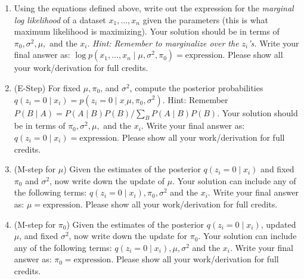 \begin{enumerate}
\item {} Using the equations defined above, write out the
  expression for the {\em marginal log likelihood} of a dataset $x_1,
  \dots, x_n$ given the parameters (this is what maximum likelihood is
  maximizing). Your solution should be in terms of $\pi_0, \sigma^2,
  \mu,$ and the $x_i$. {\em Hint: Remember to marginalize over the
    $z_i$'s.}  Write your final answer as: $\log p(x_1,\dots,x_n \mid
  \mu,\sigma^2,\pi_0) = \textrm{expression}$. Please show all your work/derivation for full credits.


\item {} (E-Step) For fixed $\mu,\pi_0$, and $\sigma^2$,
  compute the posterior probabilities $q(z_i = 0 \mid x_i) = p(z_i = 0
  \mid x_, \mu,\pi_0,\sigma^2)$.  Hint: Remember $P(B \mid A) = P(A
  \mid B)P(B)/\sum_B P(A \mid B)P(B)$.  Your solution should be in
  terms of $\pi_0, \sigma^2, \mu,$ and the $x_i$.  Write your final
  answer as: $q(z_i = 0 \mid x_i) = \textrm{expression}$. Please show all your work/derivation for full credits.
  
  
\item {} (M-step for $\mu$) Given the estimates of the
  posterior $q(z_i = 0 \mid x_i)$ and fixed $\pi_0$ and $\sigma^2$,
  now write down the update of $\mu$.  Your solution can include any
  of the following terms: $q(z_i = 0 \mid x_i), \pi_0, \sigma^2$ and
  the $x_i$.  Write your final answer as: $\mu = \textrm{expression}$. Please show all your work/derivation for full credits.


  
\item {} (M-step for $\pi_0$) Given the estimates of the
  posterior $q(z_i = 0 \mid x_i)$, updated $\mu$, and fixed
  $\sigma^2$, now write down the update for $\pi_0$.  Your solution
  can include any of the following terms: $q(z_i = 0 \mid x_i), \mu,
  \sigma^2$ and the $x_i$.  Write your final answer as: $\pi_0 =
  \textrm{expression}$. Please show all your work/derivation for full credits.
  


\end{enumerate}
